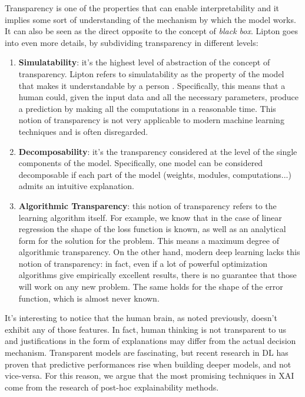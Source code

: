 Transparency is one of the properties that can enable interpretability and it implies some sort of understanding of the mechanism by which the model works. It can also be seen as the direct opposite to the concept of \textit{black box}. Lipton \cite{lipton2017mythos} goes into even more details, by subdividing transparency in different levels:
\begin{enumerate}
	\item \textbf{Simulatability}: it's the highest level of abstraction of the concept of transparency. Lipton refers to simulatability as the property of the model that makes it understandable by a person . Specifically, this means that a human could, given the input data and all the necessary parameters, produce a prediction by making all the computations in a reasonable time. This notion of transparency is not very applicable to modern machine learning techniques and is often disregarded. 
	\item \textbf{Decomposability}: it's the transparency considered at the level of the single components of the model. Specifically, one model can be considered decomposable if each part of the model (weights, modules, computations...) admits an intuitive explanation.
	\item \textbf{Algorithmic Transparency}: this notion of transparency refers to the learning algorithm itself. For example, we know that in the case of linear regression the shape of the loss function is known, as well as an analytical form for the solution for the problem. This means a maximum degree of algorithmic transparency. On the other hand, modern deep learning lacks this notion of transparency: in fact, even if a lot of powerful optimization algorithms give empirically excellent results, there is no guarantee that those will work on any new problem. The same holds for the shape of the error function, which is almost never known.
\end{enumerate}

It's interesting to notice that the human brain, as noted previously, doesn't exhibit any of those features. In fact, human thinking is not transparent to us and justifications in the form of explanations may differ from the actual decision mechanism. Transparent models are fascinating, but recent research in DL has proven that predictive performances rise when building deeper models, and not vice-versa. For this reason, we argue that the most promising techniques in XAI come from the research of post-hoc explainability methods.

